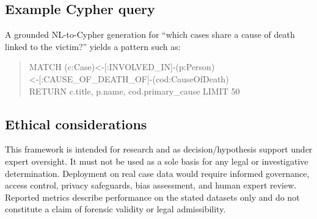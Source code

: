 \documentclass[conference]{IEEEtran}
\begin{document}
\subsection{Example Cypher query}
A grounded NL-to-Cypher generation for ``which cases share a cause of death linked
to the victim?'' yields a pattern such as:
\begin{quote}\footnotesize\ttfamily
MATCH (c:Case)<-[:INVOLVED\_IN]-(p:Person)\\
\hspace*{1em}<-[:CAUSE\_OF\_DEATH\_OF]-(cod:CauseOfDeath)\\
RETURN c.title, p.name, cod.primary\_cause LIMIT 50
\end{quote}

\subsection{Ethical considerations}
This framework is intended for research and as decision/hypothesis support under
expert oversight. It must not be used as a sole basis for any legal or
investigative determination. Deployment on real case data would require informed
governance, access control, privacy safeguards, bias assessment, and human expert
review. Reported metrics describe performance on the stated datasets only and do
not constitute a claim of forensic validity or legal admissibility.

\end{document}
